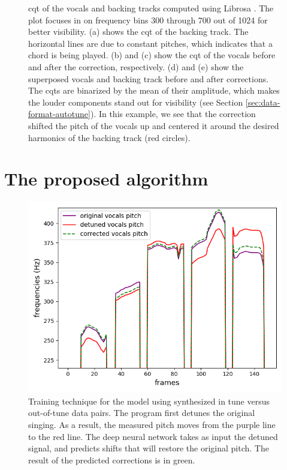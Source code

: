 \begin{figure}[t]
    \caption{
    \gls{cqt} of the vocals and backing tracks computed using Librosa \cite{mcfee2015librosa}. The plot focuses in on frequency bins 300 through 700 out of 1024 for better visibility. (a) shows the \gls{cqt} of the backing track. The horizontal lines are due to constant pitches, which indicates that a chord is being played. (b) and (c) show the \gls{cqt} of the vocals before and after the correction, respectively. (d) and (e) show the superposed vocals and backing track before and after corrections. The \gls{cqt}s are binarized by the mean of their amplitude, which makes the louder components stand out for visibility (see Section \ref{sec:data-format-autotune}). In this example, we see that the correction shifted the pitch of the vocals up and centered it around the desired harmonics of the backing track (red circles).
    }
    \label{fig:model-input-autotune}
\end{figure}

\section{The proposed algorithm}
\label{sec:proposed-autotune}

\begin{figure}[t!]
    \centering
    \includegraphics[width=12cm]{images/pitch_before_detuned_after.png}
    \caption{Training technique for the model using synthesized in tune versus out-of-tune data pairs. The program first detunes the original singing. As a result, the measured pitch moves from the purple line to the red line. The deep neural network takes as input the detuned signal, and predicts shifts that will restore the original pitch. The result of the predicted corrections is in green.}
    \label{fig:results}
\end{figure}


